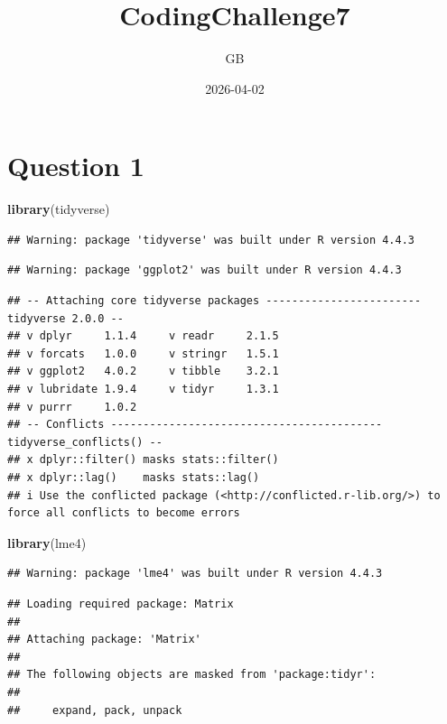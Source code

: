 \documentclass[
]{article}
\title{CodingChallenge7}
\author{GB}
\date{2026-04-02}
\newenvironment{Shaded}{\begin{snugshade}}{\end{snugshade}}
\newcommand{\FunctionTok}[1]{\textcolor[rgb]{0.13,0.29,0.53}{\textbf{#1}}}
\newcommand{\NormalTok}[1]{#1}
\begin{document}
\maketitle

\section{Question 1}\label{question-1}

\begin{Shaded}
\begin{Highlighting}[]
\FunctionTok{library}\NormalTok{(tidyverse)}
\end{Highlighting}
\end{Shaded}

\begin{verbatim}
## Warning: package 'tidyverse' was built under R version 4.4.3
\end{verbatim}

\begin{verbatim}
## Warning: package 'ggplot2' was built under R version 4.4.3
\end{verbatim}

\begin{verbatim}
## -- Attaching core tidyverse packages ------------------------ tidyverse 2.0.0 --
## v dplyr     1.1.4     v readr     2.1.5
## v forcats   1.0.0     v stringr   1.5.1
## v ggplot2   4.0.2     v tibble    3.2.1
## v lubridate 1.9.4     v tidyr     1.3.1
## v purrr     1.0.2     
## -- Conflicts ------------------------------------------ tidyverse_conflicts() --
## x dplyr::filter() masks stats::filter()
## x dplyr::lag()    masks stats::lag()
## i Use the conflicted package (<http://conflicted.r-lib.org/>) to force all conflicts to become errors
\end{verbatim}

\begin{Shaded}
\begin{Highlighting}[]
\FunctionTok{library}\NormalTok{(lme4)}
\end{Highlighting}
\end{Shaded}

\begin{verbatim}
## Warning: package 'lme4' was built under R version 4.4.3
\end{verbatim}

\begin{verbatim}
## Loading required package: Matrix
## 
## Attaching package: 'Matrix'
## 
## The following objects are masked from 'package:tidyr':
## 
##     expand, pack, unpack
\end{verbatim}
\end{document}
